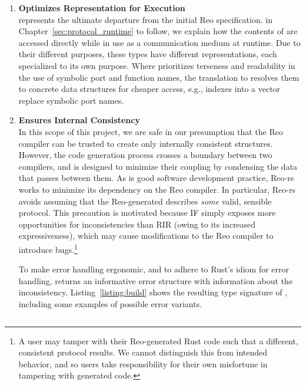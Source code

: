 \begin{enumerate}
	\item \textbf{Optimizes Representation for Execution}\\
	 represents the ultimate departure from the initial Reo specification. in Chapter~\ref{sec:protocol_runtime} to follow, we explain how the contents of  are accessed directly while in use as a communication medium at runtime. Due to their different purposes, these types have different representations, each specialized to its own purpose. Where  prioritizes terseness and readability in the use of symbolic port and function names, the translation to  resolves them to concrete data structures for cheaper access, e.g., indexes into a vector replace symbolic port names.
	
	\item \textbf{Ensures Internal Consistency}\\
	In this scope of this project, we are safe in our presumption that the Reo compiler can be trusted to create only internally consistent  structures. However, the code generation process crosses a boundary between two compilers, and is designed to minimize their coupling by condensing the data that passes between them. As is good software development practice, Reo-rs works to minimize its dependency on the Reo compiler. In particular, Reo-rs avoids assuming that the Reo-generated  describes \textit{some} valid, sensible protocol. This precaution is motivated because IF simply exposes more opportunities for inconsistencies than RIR (owing to its increased expressiveness), which may cause modifications to the Reo compiler to introduce bugs.\footnote{A user may tamper with their Reo-generated Rust code such that a different, consistent protocol results. We cannot distinguish this from intended behavior, and so users take responsibility for their own misfortune in tampering with generated code.}
	
	To make error handling ergonomic, and to adhere to Rust's idiom for error handling,  returns an informative error structure with information about the inconsistency. Listing~\ref{listing:build}	shows the resulting type signature of , including some examples of possible error variants.
\end{enumerate}


\begin{listing}[ht]
	\centering
	\inputminted[]{rust}{build.rs}
	\caption[TODO.]{Signature of the~ function. Its inputs are (1) an immutable reference to a , which is used to determine the protocol's behavior, and (2) a , which stores initialized memory cells to be incorporated into the protocol's state. The return result is an enumeration type, returning  upon success, and a tuple on failure, whose elements are, respectively (1) the index of the imperative rule where the error occurred if applicable, and (2) another sum type, communicating the nature of the error with additional information. }
	\label{listing:build}
\end{listing}

